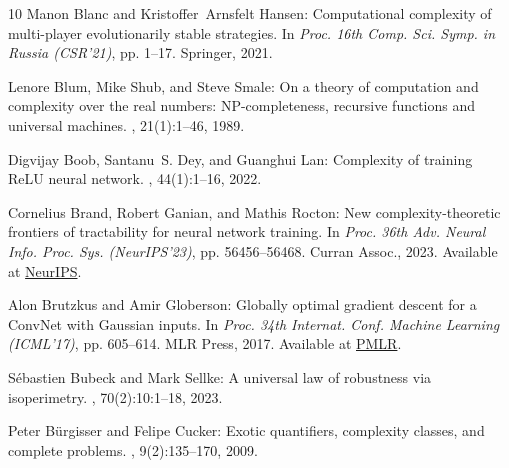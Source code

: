 \begin{thebibliography}{10}
{\sc Manon Blanc and Kristoffer~Arnsfelt Hansen}: Computational complexity of
  multi-player evolutionarily stable strategies.
\newblock In {\em Proc. 16th Comp. Sci. Symp. in Russia (CSR'21)}, pp. 1--17.
  Springer, 2021.
\newblock [\epfmtdoi{10.1007/978-3-030-79416-3\_1}]

{\sc Lenore Blum, Mike Shub, and Steve Smale}: On a theory of computation and
  complexity over the real numbers: {NP}-completeness, recursive functions and
  universal machines.
, 21(1):1--46, 1989.
\newblock [\epfmtdoi{10.1090/S0273-0979-1989-15750-9}]

{\sc Digvijay Boob, Santanu~S. Dey, and Guanghui Lan}: Complexity of training
  {ReLU} neural network.
, 44(1):1--16, 2022.

{\sc Cornelius Brand, Robert Ganian, and Mathis Rocton}: New
  complexity-theoretic frontiers of tractability for neural network training.
\newblock In {\em Proc. 36th Adv. Neural Info. Proc. Sys. (NeurIPS'23)}, pp.
  56456--56468. Curran Assoc., 2023.
\newblock Available at
  \href{https://papers.nips.cc/paper_files/paper/2023/hash/b07091c16719ad3990e3d1ccee6641f1-Abstract-Conference.html}{NeurIPS}.

{\sc Alon Brutzkus and Amir Globerson}: Globally optimal gradient descent for a
  {ConvNet} with {G}aussian inputs.
\newblock In {\em Proc. 34th Internat. Conf. Machine Learning (ICML'17)}, pp.
  605--614. MLR Press, 2017.
\newblock Available at
  \href{https://proceedings.mlr.press/v70/brutzkus17a.html}{PMLR}.

{\sc S{\'e}bastien Bubeck and Mark Sellke}: A universal law of robustness via
  isoperimetry.
, 70(2):10:1--18, 2023.
\newblock [\epfmtdoi{10.1145/3578580}]

{\sc Peter B{\"{u}}rgisser and Felipe Cucker}: Exotic quantifiers, complexity
  classes, and complete problems.
, 9(2):135--170, 2009.
\newblock [\epfmtdoi{10.1007/s10208-007-9006-9}]


\end{thebibliography}
